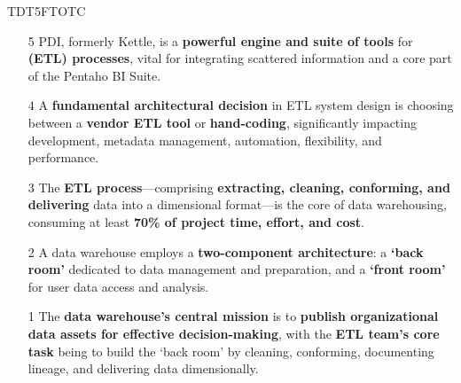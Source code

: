 \documentclass[aspectratio=169]{beamer}
\begin{document}
\begin{frame}{TDT5FTOTC}
    \small
    \begin{enumerate}
        \item[5] PDI, formerly Kettle, is a \textbf{powerful engine and suite of tools} for \textbf{(ETL) processes}, vital for integrating scattered information and a core part of the Pentaho BI Suite. \pause

        \item[4] A \textbf{fundamental architectural decision} in ETL system design is choosing between a \textbf{vendor ETL tool} or \textbf{hand-coding}, significantly impacting development, metadata management, automation, flexibility, and performance. \pause

        \item[3] The \textbf{ETL process}---comprising \textbf{extracting, cleaning, conforming, and delivering} data into a dimensional format---is the core of data warehousing, consuming at least \textbf{70\% of project time, effort, and cost}. \pause

        \item[2] A data warehouse employs a \textbf{two-component architecture}: a \textbf{`back room'} dedicated to data management and preparation, and a \textbf{`front room'} for user data access and analysis. \pause

        \item[1] The \textbf{data warehouse's central mission} is to \textbf{publish organizational data assets for effective decision-making}, with the \textbf{ETL team's core task} being to build the `back room' by cleaning, conforming, documenting lineage, and delivering data dimensionally.
    \end{enumerate}
\end{frame}
\end{document}
